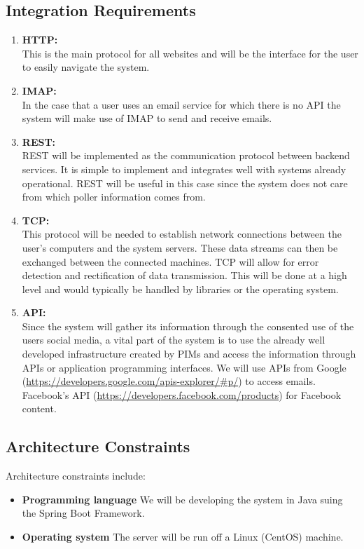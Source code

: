 \documentclass[hidelinks,english]{article}
\begin{document}
		\subsection{Integration Requirements}
			\begin{enumerate}
		        \item \textbf{HTTP:}\\
		            This is the main protocol for all websites and will be the interface for the user to easily navigate the system.
		        \item \textbf{IMAP:}\\
		            In the case that a user uses an email service for which there is no API the system will make use of IMAP to send and receive emails.
		        \item \textbf{REST:}\\
		            REST will be implemented as the communication protocol between backend services. It is simple to implement and integrates well with systems already operational. REST will be useful in this case since the system does not care from which poller information comes from.
		        \item \textbf{TCP:}\\
		            This protocol will be needed to establish network connections between the user's computers and the system servers. These data streams can then be exchanged between the connected machines. TCP will allow for error detection and rectification of data transmission. This will be done at a high level and would typically be handled by libraries or the operating system.
		        \item \textbf{API:}\\
		            Since the system will gather its information through the consented use of the users social media, a vital part of the system is to use the already well developed infrastructure created by PIMs and access the information through APIs or application programming interfaces. We will use APIs from Google (\sloppy\url{https://developers.google.com/apis-explorer/\#p/}) to access emails. Facebook's API (\sloppy\url{https://developers.facebook.com/products}) for Facebook content.
	    		\end{enumerate}
		
		\subsection{Architecture Constraints}
			Architecture constraints include:
			\begin{itemize}
				\item \textbf{Programming language} We will be developing the system in Java suing the Spring Boot Framework.
				\item \textbf{Operating system} The server will be run off a Linux (CentOS) machine. 
			\end{itemize}
\end{document}
